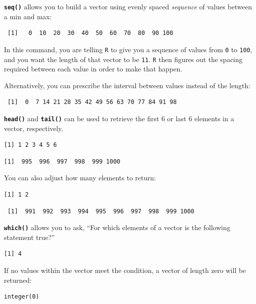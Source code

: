 \documentclass[
]{book}
\begin{document}
\textbf{\texttt{seq()}} allows you to build a vector using evenly spaced \emph{sequence} of values between a min and max:

\begin{verbatim}
 [1]   0  10  20  30  40  50  60  70  80  90 100
\end{verbatim}

In this command, you are telling \texttt{R} to give you a sequence of values from \texttt{0} to \texttt{100}, and you want the length of that vector to be \texttt{11}. \texttt{R} then figures out the spacing required between each value in order to make that happen.

Alternatively, you can prescribe the interval between values instead of the length:

\begin{verbatim}
 [1]  0  7 14 21 28 35 42 49 56 63 70 77 84 91 98
\end{verbatim}

\textbf{\texttt{head()}} and \textbf{\texttt{tail()}} can be used to retrieve the first 6 or last 6 elements in a vector, respectively.

\begin{verbatim}
[1] 1 2 3 4 5 6
\end{verbatim}

\begin{verbatim}
[1]  995  996  997  998  999 1000
\end{verbatim}

You can also adjust how many elements to return:

\begin{verbatim}
[1] 1 2
\end{verbatim}

\begin{verbatim}
 [1]  991  992  993  994  995  996  997  998  999 1000
\end{verbatim}

\textbf{\texttt{which()}} allows you to ask, ``For which elements of a vector is the following statement true?''

\begin{verbatim}
[1] 4
\end{verbatim}

If no values within the vector meet the condition, a vector of length zero will be returned:

\begin{verbatim}
integer(0)
\end{verbatim}
\end{document}
